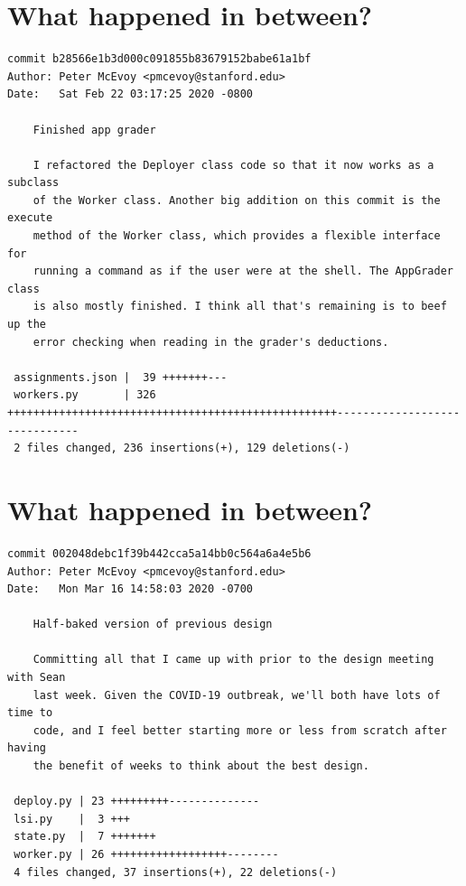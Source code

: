 \documentclass{article}
\begin{document}
\newpage

\section*{What happened in between?}
\vspace{2ex}
\begin{verbatim}
commit b28566e1b3d000c091855b83679152babe61a1bf
Author: Peter McEvoy <pmcevoy@stanford.edu>
Date:   Sat Feb 22 03:17:25 2020 -0800

    Finished app grader
    
    I refactored the Deployer class code so that it now works as a subclass
    of the Worker class. Another big addition on this commit is the execute
    method of the Worker class, which provides a flexible interface for
    running a command as if the user were at the shell. The AppGrader class
    is also mostly finished. I think all that's remaining is to beef up the
    error checking when reading in the grader's deductions.

 assignments.json |  39 +++++++---
 workers.py       | 326 +++++++++++++++++++++++++++++++++++++++++++++++++++------------------------------
 2 files changed, 236 insertions(+), 129 deletions(-)
\end{verbatim}

\newpage

\section*{What happened in between?}
\vspace{2ex}
\begin{verbatim}
commit 002048debc1f39b442cca5a14bb0c564a6a4e5b6
Author: Peter McEvoy <pmcevoy@stanford.edu>
Date:   Mon Mar 16 14:58:03 2020 -0700

    Half-baked version of previous design
    
    Committing all that I came up with prior to the design meeting with Sean
    last week. Given the COVID-19 outbreak, we'll both have lots of time to
    code, and I feel better starting more or less from scratch after having
    the benefit of weeks to think about the best design.

 deploy.py | 23 +++++++++--------------
 lsi.py    |  3 +++
 state.py  |  7 +++++++
 worker.py | 26 ++++++++++++++++++--------
 4 files changed, 37 insertions(+), 22 deletions(-)

\end{verbatim}
\end{document}
